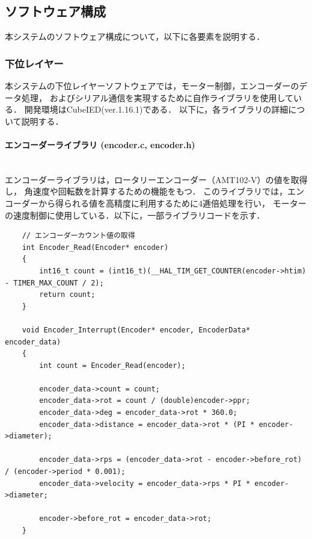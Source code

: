 
\subsection{ソフトウェア構成}
本システムのソフトウェア構成について，以下に各要素を説明する．


\subsubsection{下位レイヤー}
本システムの下位レイヤーソフトウェアでは，モーター制御，エンコーダーのデータ処理，
およびシリアル通信を実現するために自作ライブラリを使用している．
開発環境はCubeIED(ver.1.16.1)である．
以下に，各ライブラリの詳細について説明する．

\paragraph{エンコーダーライブラリ (encoder.c, encoder.h)}\mbox{}\\
エンコーダーライブラリは，ロータリーエンコーダー（AMT102-V）の値を取得し，
角速度や回転数を計算するための機能をもつ．
このライブラリでは，エンコーダーから得られる値を高精度に利用するために4逓倍処理を行い，
モーターの速度制御に使用している．以下に，一部ライブラリコードを示す．



\begin{lstlisting}
    // エンコーダーカウント値の取得
    int Encoder_Read(Encoder* encoder)
    {
        int16_t count = (int16_t)(__HAL_TIM_GET_COUNTER(encoder->htim) - TIMER_MAX_COUNT / 2);
        return count;
    }
    
    void Encoder_Interrupt(Encoder* encoder, EncoderData* encoder_data)
    {
        int count = Encoder_Read(encoder);
    
        encoder_data->count = count;
        encoder_data->rot = count / (double)encoder->ppr;
        encoder_data->deg = encoder_data->rot * 360.0;
        encoder_data->distance = encoder_data->rot * (PI * encoder->diameter);
    
        encoder_data->rps = (encoder_data->rot - encoder->before_rot) / (encoder->period * 0.001);
        encoder_data->velocity = encoder_data->rps * PI * encoder->diameter;
    
        encoder->before_rot = encoder_data->rot;
    }
\end{lstlisting}

